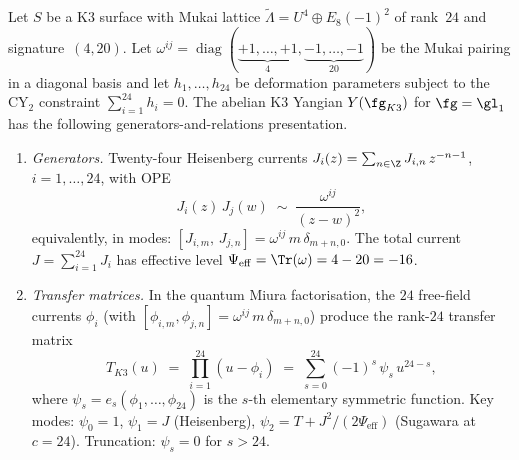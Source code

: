 \begin{theorem}
\label{thm:k3-abelian-yangian-presentation}
\label{thm:k3-yangian-presentation}
Let $S$ be a K3 surface with Mukai lattice
$\widetilde{\Lambda} = U^4 \oplus E_8(-1)^2$
of rank~$24$ and signature~$(4,20)$.
Let $\omega^{ij} = \operatorname{diag}(\underbrace{+1,\ldots,+1}_{4},
\underbrace{-1,\ldots,-1}_{20})$ be the Mukai pairing in a
diagonal basis and let $h_1, \ldots, h_{24}$ be deformation parameters
subject to the CY$_2$ constraint $\sum_{i=1}^{24} h_i = 0$.
The abelian K3 Yangian $Y(\fg_{K3})$ for $\fg = \gl_1$ has the
following generators-and-relations presentation.
\begin{enumerate}[label=\textup{(\roman*)}]

\item \emph{Generators.}
Twenty-four Heisenberg currents
$J_i(z) = \sum_{n \in \Z} J_{i,n}\, z^{-n-1}$, $i = 1,\ldots, 24$,
with OPE
\begin{equation}\label{eq:k3-yangian-ope}
 J_i(z)\, J_j(w) \;\sim\; \frac{\omega^{ij}}{(z - w)^2},
\end{equation}
equivalently, in modes:
$[J_{i,m},\, J_{j,n}] = \omega^{ij}\, m\, \delta_{m+n,0}$.
The total current $J = \sum_{i=1}^{24} J_i$ has effective level
$\Psi_{\mathrm{eff}} = \Tr(\omega) = 4 - 20 = -16$.

\item \emph{Transfer matrices.}
In the quantum Miura factorisation, the $24$ free-field currents
$\phi_i$ (with $[\phi_{i,m}, \phi_{j,n}] = \omega^{ij}\, m\,
\delta_{m+n,0}$)
produce the rank-$24$ transfer matrix
\begin{equation}\label{eq:k3-yangian-miura}
 T_{K3}(u) \;=\; \prod_{i=1}^{24} (u - \phi_i)
 \;=\; \sum_{s=0}^{24} (-1)^s\, \psi_s\, u^{24-s},
\end{equation}
where $\psi_s = e_s(\phi_1, \ldots, \phi_{24})$ is the $s$-th
elementary symmetric function.
Key modes: $\psi_0 = 1$, $\psi_1 = J$ (Heisenberg),
$\psi_2 = T + J^2/(2\Psi_{\mathrm{eff}})$ (Sugawara at $c = 24$).
Truncation: $\psi_s = 0$ for $s > 24$.


\end{enumerate}
\end{theorem}
